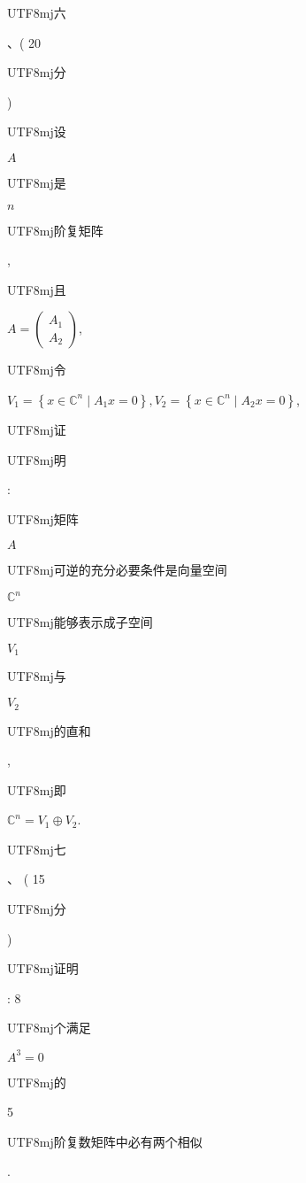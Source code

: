 \documentclass[10pt]{article}
\begin{document}
\begin{CJK}{UTF8}{mj}六\end{CJK}、( 20 \begin{CJK}{UTF8}{mj}分\end{CJK}) \begin{CJK}{UTF8}{mj}设\end{CJK} $A$ \begin{CJK}{UTF8}{mj}是\end{CJK} $n$ \begin{CJK}{UTF8}{mj}阶复矩阵\end{CJK}, \begin{CJK}{UTF8}{mj}且\end{CJK} $A=\left(\begin{array}{c}A_{1} \\ A_{2}\end{array}\right)$, \begin{CJK}{UTF8}{mj}令\end{CJK} $V_{1}=\left\{x \in \mathbb{C}^{n} \mid A_{1} x=0\right\}, V_{2}=\left\{x \in \mathbb{C}^{n} \mid A_{2} x=0\right\}$, \begin{CJK}{UTF8}{mj}证\end{CJK} \begin{CJK}{UTF8}{mj}明\end{CJK}: \begin{CJK}{UTF8}{mj}矩阵\end{CJK} $A$ \begin{CJK}{UTF8}{mj}可逆的充分必要条件是向量空间\end{CJK} $\mathbb{C}^{n}$ \begin{CJK}{UTF8}{mj}能够表示成子空间\end{CJK} $V_{1}$ \begin{CJK}{UTF8}{mj}与\end{CJK} $V_{2}$ \begin{CJK}{UTF8}{mj}的直和\end{CJK}, \begin{CJK}{UTF8}{mj}即\end{CJK} $\mathbb{C}^{n}=V_{1} \oplus V_{2}$.

\begin{CJK}{UTF8}{mj}七\end{CJK}、 ( 15 \begin{CJK}{UTF8}{mj}分\end{CJK}) \begin{CJK}{UTF8}{mj}证明\end{CJK}: 8 \begin{CJK}{UTF8}{mj}个满足\end{CJK} $A^{3}=0$ \begin{CJK}{UTF8}{mj}的\end{CJK} 5 \begin{CJK}{UTF8}{mj}阶复数矩阵中必有两个相似\end{CJK}.
\end{document}
